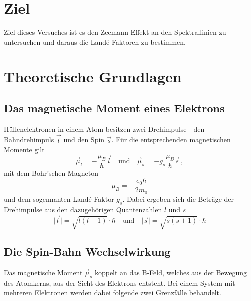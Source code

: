 \section{Ziel}
    Ziel dieses Versuches ist es den Zeemann-Effekt an den Spektrallinien zu untersuchen und
    daraus die Landé-Faktoren zu bestimmen.
\section{Theoretische Grundlagen}
    \subsection{Das magnetische Moment eines Elektrons}
        Hüllenelektronen in einem Atom besitzen zwei Drehimpulse - den Bahndrehimpuls $\vec{l}$ und den Spin $\vec{s}$.
        Für die entsprechenden magnetischen Momente gilt
        \begin{equation}
            \vec{\mu}_l = -\frac{\mu_B}{\hbar}\vec{l} \quad\text{und}\quad \vec{\mu}_s = -g_s\frac{\mu_B}{\hbar}\vec{s} \, ,
        \end{equation}
        mit dem Bohr'schen Magneton
        \begin{equation}
            \mu_B=-\frac{e_0\hbar}{2m_0}
        \end{equation}
        und dem sogennanten Landé-Faktor $g_s$.
        Dabei ergeben sich die Beträge der Drehimpulse aus den dazugehörigen Quantenzahlen $l$ und $s$
        \begin{equation}
            \vert\vec{l}\vert=\sqrt{l(l+1)}\cdot\hbar \quad\text{und}\quad \vert\vec{s}\vert=\sqrt{s(s+1)}\cdot\hbar
        \end{equation}
    \subsection{Die Spin-Bahn Wechselwirkung}
        Das magnetische Moment $\vec{\mu}_s$ koppelt an das B-Feld, welches aus der Bewegung des Atomkerns,
        aus der Sicht des Elektrons entsteht.
        Bei einem System mit mehreren Elektronen werden dabei folgende zwei Grenzfälle behandelt.
